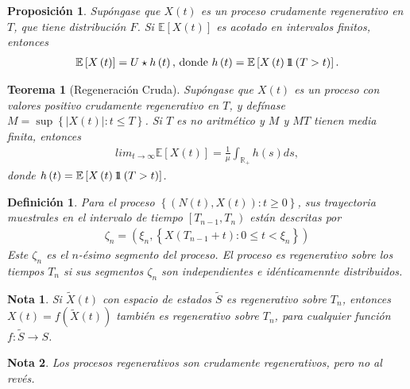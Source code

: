 \documentclass{article}
\newtheorem{Def}{Definición}[section]
\newtheorem{Teo}{Teorema}[section]
\newtheorem{Note}{Nota}[section]
\newtheorem{Prop}{Proposición}[section]
\newcommand{\rea}{\mathbb{R}}
\newcommand{\esp}{\mathbb{E}}
\newcommand{\indora}{\mbox{$1$\hspace{-0.8ex}$1$}}
\numberwithin{equation}{section}
\begin{document}
\begin{Prop}
Sup\'ongase que $X\left(t\right)$ es un proceso crudamente regenerativo en $T$, que tiene distribuci\'on $F$. Si $\esp\left[X\left(t\right)\right]$ es acotado en intervalos finitos, entonces
\begin{eqnarray}
\esp\left[X\left(t\right)\right]=U\star h\left(t\right)\textrm{,  donde }h\left(t\right)=\esp\left[X\left(t\right)\indora\left(T>t\right)\right].
\end{eqnarray}
\end{Prop}

\begin{Teo}[Regeneraci\'on Cruda]
Sup\'ongase que $X\left(t\right)$ es un proceso con valores positivo crudamente regenerativo en $T$, y def\'inase $M=\sup\left\{|X\left(t\right)|:t\leq T\right\}$. Si $T$ es no aritm\'etico y $M$ y $MT$ tienen media finita, entonces
\begin{eqnarray}
lim_{t\rightarrow\infty}\esp\left[X\left(t\right)\right]=\frac{1}{\mu}\int_{\rea_{+}}h\left(s\right)ds,
\end{eqnarray}
donde $h\left(t\right)=\esp\left[X\left(t\right)\indora\left(T>t\right)\right]$.
\end{Teo}


\begin{Def}
Para el proceso $\left\{\left(N\left(t\right),X\left(t\right)\right):t\geq0\right\}$, sus trayectoria muestrales en el intervalo de tiempo $\left[T_{n-1},T_{n}\right)$ est\'an descritas por
\begin{eqnarray*}
\zeta_{n}=\left(\xi_{n},\left\{X\left(T_{n-1}+t\right):0\leq t<\xi_{n}\right\}\right)
\end{eqnarray*}
Este $\zeta_{n}$ es el $n$-\'esimo segmento del proceso. El proceso es regenerativo sobre los tiempos $T_{n}$ si sus segmentos $\zeta_{n}$ son independientes e id\'enticamennte distribuidos.
\end{Def}


\begin{Note}
Si $\tilde{X}\left(t\right)$ con espacio de estados $\tilde{S}$ es regenerativo sobre $T_{n}$, entonces $X\left(t\right)=f\left(\tilde{X}\left(t\right)\right)$ tambi\'en es regenerativo sobre $T_{n}$, para cualquier funci\'on $f:\tilde{S}\rightarrow S$.
\end{Note}

\begin{Note}
Los procesos regenerativos son crudamente regenerativos, pero no al rev\'es.
\end{Note}
\end{document}
